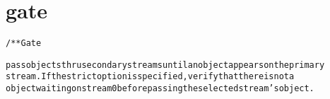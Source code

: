 \section{gate}
\begin{shaded}
\begin{alltt}
/** Gate

pass objects thru secondary streams until an object appears on the primary
stream.  If the strict option is specified, verify that there is not a
object waiting on stream 0 before passing the selected stream's object.

\end{alltt}
\end{shaded}
